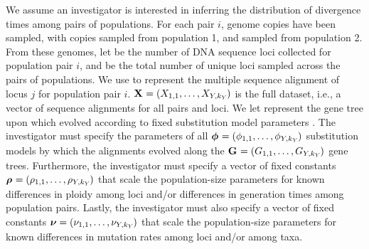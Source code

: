 We assume an investigator is interested in inferring the distribution
of divergence times among \npairs{} pairs of populations.
For each pair $i$,  genome copies have been sampled, with
 copies sampled from population 1, and 
sampled from population 2.
From these genomes, let  be the number of DNA sequence loci collected
for population pair $i$, and \nlociTotal be the total number of unique loci
sampled across the \npairs{} pairs of populations.
We use  to represent the multiple sequence alignment of
locus $j$ for population pair $i$.
$\alignmentVector = (\alignment{1}{1}, \ldots,
    \alignment{\npairs{}}{\nloci{\npairs{}}})$
is the full dataset,
i.e., a vector of sequence alignments for all pairs and loci.
We let  represent the gene tree upon which 
evolved according to fixed \hky substitution model parameters .
The investigator must specify the parameters of all
$\hkyModelVector = (\hkyModel{1}{1}, \ldots,
\hkyModel{\npairs{}}{\nloci{\npairs{}}})$
substitution models by which the alignments evolved along the
$\geneTreeVector = (\geneTree{1}{1}, \ldots,
\geneTree{\npairs{}}{\nloci{\npairs{}}})$
gene trees.
Furthermore, the investigator must specify a vector of fixed constants
$\ploidyScalarVector = (\ploidyScalar{1}{1}, \ldots,
\ploidyScalar{\npairs{}}{\nloci{\npairs{}}})$
that scale the population-size parameters for known differences in ploidy among
loci and/or differences in generation times among population pairs.  Lastly,
the investigator must also specify a vector of fixed constants
$\mutationRateScalarConstantVector = (\mutationRateScalarConstant{1}{1},
\ldots, \mutationRateScalarConstant{\npairs{}}{\nloci{\npairs{}}})$
that scale the population-size parameters for known differences in
mutation rates among loci and/or among taxa.

